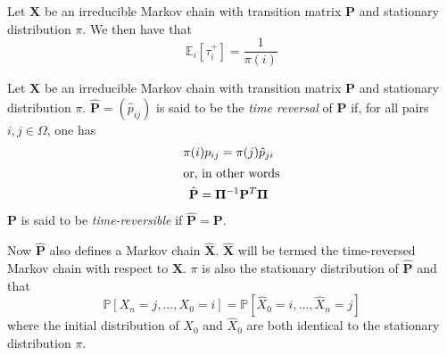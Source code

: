 \begin{proposition}
  \label{prop:2}
  Let $\mathbf{X}$ be an irreducible
  Markov chain with transition matrix $\mathbf{P}$ and stationary
  distribution $\pi$. We then have that
  \begin{equation}
    \label{eq:9}
    \mathbb{E}_{i}[\tau_i^{+}] = \frac{1}{\pi(i)}
  \end{equation}
\end{proposition}

\begin{definition}
  \label{def:9}
  Let $\mathbf{X}$ be an irreducible Markov chain with transition
  matrix $\mathbf{P}$ and stationary distribution
  $\pi$. $\hat{\mathbf{P}} = (\hat{p}_{ij})$ is said to be the {\em
    time reversal} of $\mathbf{P}$ if, for all pairs $i,j \in \Omega$,
  one has
  \begin{gather}
    \label{eq:16}
    \pi(i) p_{ij} = \pi(j) \hat{p}_{ji} \\
    \intertext{or, in other words}
    \label{eq:78}
    \hat{\mathbf{P}} = \bm{\Pi}^{-1} \mathbf{P}^{T} \bm{\Pi} 
  \end{gather}
  $\mathbf{P}$ is said to be {\em time-reversible} if
  $\hat{\mathbf{P}} = \mathbf{P}$.
\end{definition}
Now $\hat{\mathbf{P}}$ also defines a Markov chain
$\hat{\mathbf{X}}$. $\hat{\mathbf{X}}$ will be termed the
time-reversed Markov chain with respect to $\mathbf{X}$. $\pi$ is also
the stationary distribution of $\hat{\mathbf{P}}$ and that
\begin{equation}
  \label{eq:17}
  \mathbb{P}[X_n = j, \dots, X_0 = i] = \mathbb{P}[\hat{X}_0 = i,
  \dots, \hat{X}_n = j] 
\end{equation}
where the initial distribution of $X_0$ and $\hat{X}_0$ are both
identical to the stationary distribution $\pi$.
